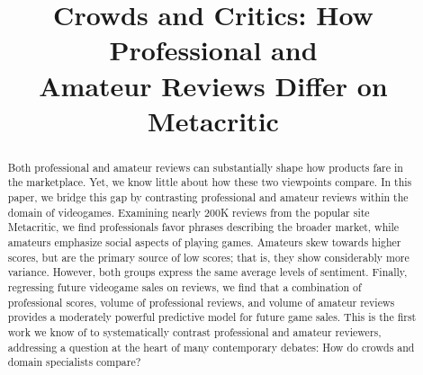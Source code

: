 \documentclass[letterpaper]{article}
\begin{document}
%

\skip{}\bigskipamount     %
\renewcommand*{\footnoterule}{
  \kern-3pt
  \hrule width 2in
  \kern 2.6pt
  \vspace{\smallskipamount}       %
}
\renewcommand\arraystretch{1.3}

\makeatletter
\def\url@leostyle{%
  \@ifundefined{selectfont}{\def\UrlFont{\sf}}{\def\UrlFont{\small\ttfamily}}}
\makeatother



\markright{\today}

\title{Crowds and Critics: How Professional and \\Amateur Reviews
Differ on Metacritic}
\author{
}
\maketitle

\begin{abstract}
Both professional and amateur reviews can substantially shape
how products fare in the marketplace. Yet, we know little about how these two
viewpoints compare. 
In this paper, we bridge this gap by contrasting professional and
amateur reviews within the 
domain of videogames. Examining nearly 200K 
reviews from the popular site Metacritic, we find
professionals favor phrases describing the broader market, while
amateurs emphasize social aspects of playing games. Amateurs skew
towards higher scores, but are the primary source of low
scores; that is, they show considerably more variance. 
However, both groups express the same average levels of sentiment.
Finally, regressing future videogame sales on reviews, we
find that a combination of professional scores, volume of professional
reviews, and volume of amateur reviews provides a moderately powerful
predictive model for future game sales. This is the first work
we know of to systematically contrast professional and amateur
reviewers, addressing a question at the heart
of many contemporary debates: How do crowds and domain
specialists compare?

\end{abstract}
\end{document}
